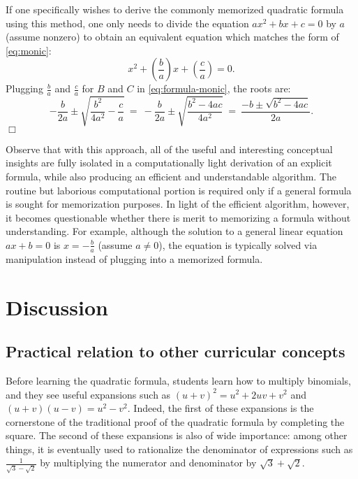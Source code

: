 If one specifically wishes to derive the commonly memorized quadratic
formula using this method, one only needs to divide the equation $ax^2 + bx
+ c = 0$ by $a$ (assume nonzero) to obtain an equivalent equation which matches
the form of \eqref{eq:monic}:
\begin{displaymath}
  x^2 + \left( \frac{b}{a} \right) x + \left( \frac{c}{a} \right) = 0.
\end{displaymath}
Plugging $\frac{b}{a}$ and $\frac{c}{a}$ for $B$ and $C$ in
\eqref{eq:formula-monic}, the roots are:
\begin{displaymath}
  -\frac{b}{2a} \pm \sqrt{\frac{b^2}{4a^2} - \frac{c}{a}}
  \ = \ 
  -\frac{b}{2a} \pm \sqrt{\frac{b^2 - 4ac}{4a^2}}
  \ = \ 
  \frac{-b \pm \sqrt{b^2 - 4ac}}{2a}.
\end{displaymath}
\hfill $\Box$

Observe that with this approach, all of the useful and interesting conceptual
insights are fully isolated in a computationally light derivation of an explicit
formula, while also producing an efficient and understandable algorithm. The
routine but laborious computational portion is required only if a general
formula is sought for memorization purposes.  In light of the efficient
algorithm, however, it becomes questionable whether there is merit to memorizing
a formula without understanding. For example, although the solution to a general
linear equation $ax + b = 0$ is $x = -\frac{b}{a}$ (assume $a \neq 0$), the
equation is typically solved via manipulation instead of plugging into a
memorized formula.


\section{Discussion}

\subsection{Practical relation to other curricular concepts}

Before learning the quadratic formula, students learn how to multiply
binomials, and they see useful expansions such as $(u + v)^2 = u^2 + 2uv +
v^2$ and $(u+v)(u-v) = u^2 - v^2$. Indeed, the first of these expansions is
the cornerstone of the traditional proof of the quadratic formula by
completing the square. The second of these expansions is also of wide
importance: among other things, it is eventually used to rationalize the
denominator of expressions such as $\frac{1}{\sqrt{3} - \sqrt{2}}$ by
multiplying the numerator and denominator by $\sqrt{3} + \sqrt{2}$.

